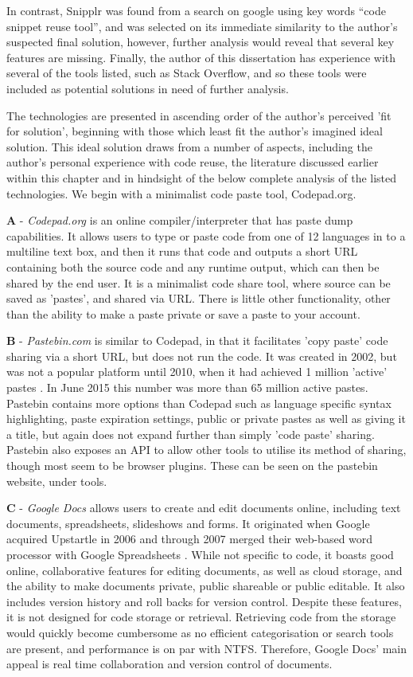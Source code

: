 In contrast, Snipplr was found from a search on google using key words “code snippet reuse tool”, and was selected on its immediate similarity to the author's suspected final solution, however, further analysis would reveal that several key features are missing. 
Finally, the author of this dissertation has experience with several of the tools listed, such as Stack Overflow, and so these tools were included as potential solutions in need of further analysis.

The technologies are presented in ascending order of the author's perceived 'fit for solution', beginning with those which least fit the author's imagined ideal solution. 
This ideal solution draws from a number of aspects, including the author's personal experience with code reuse, the literature discussed earlier within this chapter and in hindsight of the below complete analysis of the listed technologies. 
We begin with a minimalist code paste tool, Codepad.org.

\textbf{A} - \textit{Codepad.org} is an online compiler/interpreter that has paste dump capabilities. 
It allows users to type or paste code from one of 12 languages in to a multiline text box, and then it runs that code and outputs a short URL containing both the source code and any runtime output, which can then be shared by the end user. 
It is a minimalist code share tool, where source can be saved as 'pastes', and shared via URL. 
There is little other functionality, other than the ability to make a paste private or save a paste to your account.

\textbf{B} - \textit{Pastebin.com} is similar to Codepad, in that it facilitates 'copy paste' code sharing via a short URL, but does not run the code. 
It was created in 2002, but was not a popular platform until 2010, when it had achieved 1 million 'active' pastes \cite{Kumparak2011}. 
In June 2015 this number was more than 65 million active pastes. 
Pastebin contains more options than Codepad such as language specific syntax highlighting, paste expiration settings, public or private pastes as well as giving it a title, but again does not expand further than simply 'code paste' sharing. 
Pastebin also exposes an API to allow other tools to utilise its method of sharing, though most seem to be browser plugins. 
These can be seen on the pastebin website, under tools.

\textbf{C} - \textit{Google Docs} allows users to create and edit documents online, including text documents, spreadsheets, slideshows and forms.
It originated when Google acquired Upstartle in 2006 and through 2007 merged their web-based word processor with Google Spreadsheets \cite{Mazzon2006}.
While not specific to code, it boasts good online, collaborative features for editing documents, as well as cloud storage, and the ability to make documents private, public shareable or public editable.
It also includes version history and roll backs for version control.
Despite these features, it is not designed for code storage or retrieval.
Retrieving code from the storage would quickly become cumbersome as no efficient categorisation or search tools are present, and performance is on par with NTFS.
Therefore, Google Docs' main appeal is real time collaboration and version control of documents.

